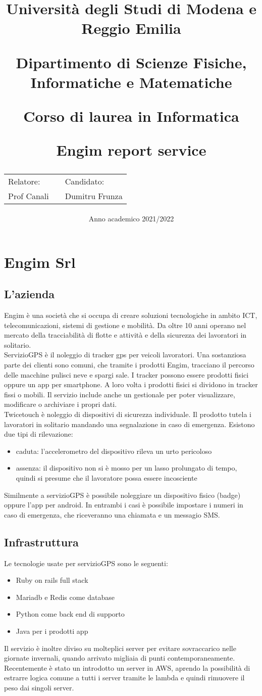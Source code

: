 \documentclass[12pt]{article}
\author{}
\title{
    \huge 
        \textbf{Università degli Studi di Modena e Reggio Emilia}
    \large
        \par Dipartimento di Scienze Fisiche, Informatiche e Matematiche
        \par Corso di laurea in Informatica
    \vfil
        \huge \par \textbf{Engim report service}
    \vfil
    \normalsize
    \begin{tabular}{lp{0.5\textwidth}l}
      Relatore: & & Candidato: \\
      Prof Canali & &  Dumitru Frunza \\
      \end{tabular}
}
\date{Anno academico 2021/2022}
\begin{document}
\maketitle
\section{Engim Srl}
\subsection{L'azienda}
Engim è una società che si occupa di creare soluzioni tecnologiche in ambito 
ICT, telecomunicazioni, sistemi di gestione e mobilità. Da oltre 10 anni operano 
nel mercato della tracciabilità di flotte e attività e della 
sicurezza dei lavoratori in solitario.
\\ ServizioGPS è il noleggio di tracker gps per veicoli lavoratori. 
Una sostanziosa parte dei clienti sono comuni, che tramite i prodotti Engim, 
tracciano il percorso delle macchine pulisci neve e spargi sale.
I tracker possono essere prodotti fisici oppure un app per smartphone. A loro 
volta i prodotti fisici si dividono in tracker fissi o mobili. Il servizio include
anche un gestionale per poter visualizzare, modificare o archiviare i propri dati.
\\ Twicetouch è noleggio di dispositivi di sicurezza individuale.
Il prodotto tutela i lavoratori in solitario mandando una segnalazione in caso di
emergenza. Esistono due tipi di rilevazione: 
\begin{itemize}
  \item caduta: l'accelerometro del dispositivo rileva un urto pericoloso
  \item assenza: il dispositivo non si è mosso per un lasso prolungato di tempo, 
  quindi si presume che il lavoratore possa essere incosciente
\end{itemize}
Similmente a servizioGPS è possibile noleggiare un dispositivo fisico (badge) oppure
l'app per android. In entrambi i casi è possibile impostare i numeri in caso di 
emergenza, che riceveranno una chiamata e un messagio SMS.


\subsection{Infrastruttura}
Le tecnologie usate per servizioGPS sono le seguenti:
\begin{itemize}
  \item Ruby on rails full stack
  \item Mariadb e Redis come database
  \item Python come back end di supporto
  \item Java per i prodotti app
\end{itemize}
Il servizio è inoltre diviso su molteplici server per evitare sovraccarico nelle
giornate invernali, quando arrivato migliaia di punti contemporaneamente.
Recentemente è stato un introdotto un server in AWS, aprendo la possibilità di
estrarre logica comune a tutti i server tramite le lambda e quindi rimuovere il
peso dai singoli server.
\end{document}
